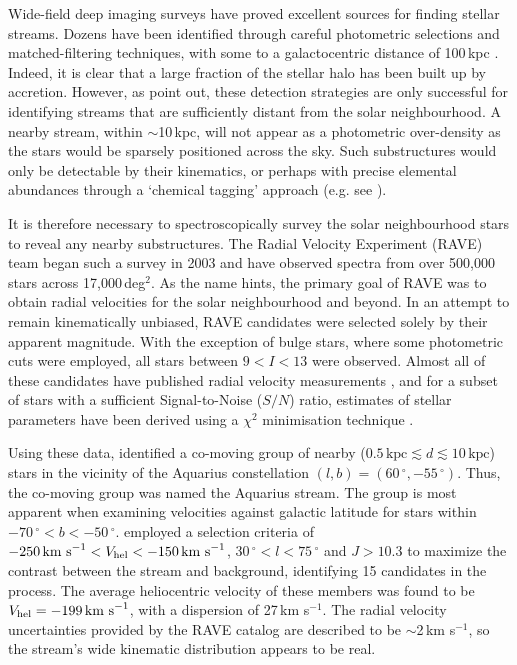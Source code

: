 \documentclass{emulateapj}
\begin{document}
Wide-field deep imaging surveys have proved excellent sources for finding stellar streams. Dozens have been identified through careful photometric selections and matched-filtering techniques, with some to a galactocentric distance of 100\,kpc \citep{belokurov;et-al_2007,drake;et-al_2013}. Indeed, it is clear that a large fraction of the stellar halo has been built up by accretion. However, as \citet{helmi;white_1999} point out, these detection strategies are only successful for identifying streams that are sufficiently distant from the solar neighbourhood. A nearby stream, within $\sim$10\,kpc, will not appear as a photometric over-density as the stars would be sparsely positioned across the sky. Such substructures would only be detectable by their kinematics, or perhaps with precise elemental abundances through a `chemical tagging' approach (e.g. see \citet{freeman;bland-hawthorn_2002}). 

It is therefore necessary to spectroscopically survey the solar neighbourhood stars to reveal any nearby substructures. The Radial Velocity Experiment (RAVE) team began such a survey in 2003 and have observed spectra from over 500,000 stars across 17,000\,deg$^{2}$. As the name hints, the primary goal of RAVE was to obtain radial velocities for the solar neighbourhood and beyond. In an attempt to remain kinematically unbiased, RAVE candidates were selected solely by their apparent magnitude. With the exception of bulge stars, where some photometric cuts were employed, all stars between $9 < I < 13$ were observed. Almost all of these candidates have published radial velocity measurements \citep{steinmetz;et-al_2006}, and for a subset of stars with a sufficient Signal-to-Noise ($S/N$) ratio, estimates of stellar parameters have been derived using a $\chi^2$ minimisation technique \citep{zwitter;et-al_2008, siebert;et-al_2011}. 

Using these data, \citet{williams;et-al_2011} identified a co-moving group of nearby (${0.5\,\mbox{kpc} \lesssim d \lesssim 10\,\mbox{kpc}}$) stars in the vicinity of the Aquarius constellation ${(l, b) = (60\,^\circ, -55\,^\circ)}$. Thus, the co-moving group was named the Aquarius stream. The group is most apparent when examining velocities against galactic latitude for stars within $-70\,^\circ < b < -50\,^\circ$. \citet{williams;et-al_2011} employed a selection criteria of $-250\,\mbox{km s}^{-1} < V_{\rm hel} < -150\,\mbox{km s}^{-1}$, $30\,^\circ < l < 75\,^\circ$ and $J > 10.3$ to maximize the contrast between the stream and background, identifying 15 candidates in the process. The average heliocentric velocity of these members was found to be $V_{\rm hel} = -199\,\mbox{km s}^{-1}$, with a dispersion of 27\,km s$^{-1}$. The radial velocity uncertainties provided by the RAVE catalog are described to be $\sim$2\,km s$^{-1}$, so the stream's wide kinematic distribution appears to be real.
\end{document}
